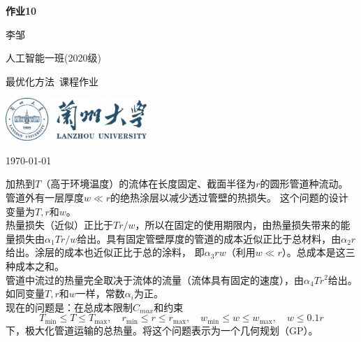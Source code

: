 \documentclass[10pt, a4paper]{article}
\newcommand\course{最优化方法}                         %
\begin{document}
\begin{titlepage}
    \begin{center}
        \vspace*{3.5cm}
            
        \Huge
        \textbf{作业10}
            
        \vspace{2cm}
        \LARGE
        李邹
            
        \vspace{0.1cm}
        \Large
        人工智能一班(2020级)                      %
        
            
        \vfill
        
        \course \ 课程作业
            
        \vspace{1cm}
            
        \includegraphics[width=0.4\textwidth]{lzu-logo.png}
        \\
        
        \Large
        
        \today
            
    \end{center}
\end{titlepage}


\newpage
\begin{Problem}
加热到$T$（高于环境温度）的流体在长度固定、截面半径为$r$的圆形管道种流动。管道外有一层厚度$w \ll r$的绝热涂层以减少透过管壁的热损失。
这个问题的设计变量为$T,r$和$w$。\\
热量损失（近似）正比于$Tr/w$，所以在固定的使用期限内，由热量损失带来的能量损失由$\alpha_{1} Tr/w$给出。具有固定管壁厚度的管道的成本近似正比于总材料，由$\alpha_{2} r$给出。涂层的成本也近似正比于总的涂料，
即$\alpha_{3} rw$（利用$w \ll r$）。总成本是这三种成本之和。\\
管道中流过的热量完全取决于流体的流量（流体具有固定的速度），由$\alpha_{4}Tr^{2}$给出。如同变量$T,r$和$w$一样，常数$\alpha_{i}$为正。\\
现在的问题是：在总成本限制$C_{max}$和约束
$$
T_{\min } \leq T \leq T_{\max }, \quad r_{\min } \leq r \leq r_{\max }, \quad w_{\min } \leq w \leq w_{\max }, \quad w \leq 0.1 r
$$
下，极大化管道运输的总热量。将这个问题表示为一个几何规划（GP）。
\end{Problem}
    
\end{document}
